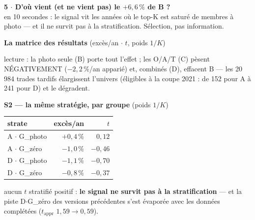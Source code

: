 \documentclass[10pt,a4paper,landscape]{article}
\begin{document}
\newpage
\begin{center}
{\Large\bfseries 5 $\cdot$ D'où vient (et ne vient pas) le $+6{,}6\,\%$ de B ?}\\[0.5mm]
{\scriptsize en 10 secondes : le signal vit les années où le top-K est saturé de membres à photo --- et il ne survit pas à la stratification. Sélection, pas information.}
\end{center}

\noindent\begin{minipage}[t]{0.46\textwidth}\vspace{0pt}
\textbf{La matrice des résultats} {\scriptsize(excès/an $\cdot$ $t$, poids $1/K$)}
\begin{center}
\end{center}
{\scriptsize lecture : la photo seule (B) porte tout l'effet ; les O/A/T (C) pèsent NÉGATIVEMENT ($-2{,}2\,\%$/an apparié) et, combinés (D), effacent B --- les 20\,984 trades tardifs élargissent l'univers (éligibles à la coupe 2021 : de 152 pour A à 241 pour D) et le dégradent.}

\vspace{2mm}
\textbf{S2 --- la même stratégie, par groupe} {\scriptsize(poids $1/K$)}
\begin{center}\small
\begin{tabular}{@{}lrr@{}}
\toprule
strate & excès/an & $t$ \\
\midrule
A $\cdot$ G\_photo & $+0{,}4\,\%$ & $0{,}12$ \\
A $\cdot$ G\_zéro & $-1{,}0\,\%$ & $-0{,}46$ \\
D $\cdot$ G\_photo & $-1{,}1\,\%$ & $-0{,}70$ \\
D $\cdot$ G\_zéro & $-0{,}8\,\%$ & $-0{,}37$ \\
\bottomrule
\end{tabular}
\end{center}
{\scriptsize aucun $t$ stratifié positif : \textbf{le signal ne survit pas à la stratification} --- et la piste \og D$\cdot$G\_zéro \fg{} des versions précédentes s'est évaporée avec les données complétées ($t_{\text{appr}}$ $1{,}59 \to 0{,}59$).}


\end{minipage}
\end{document}
